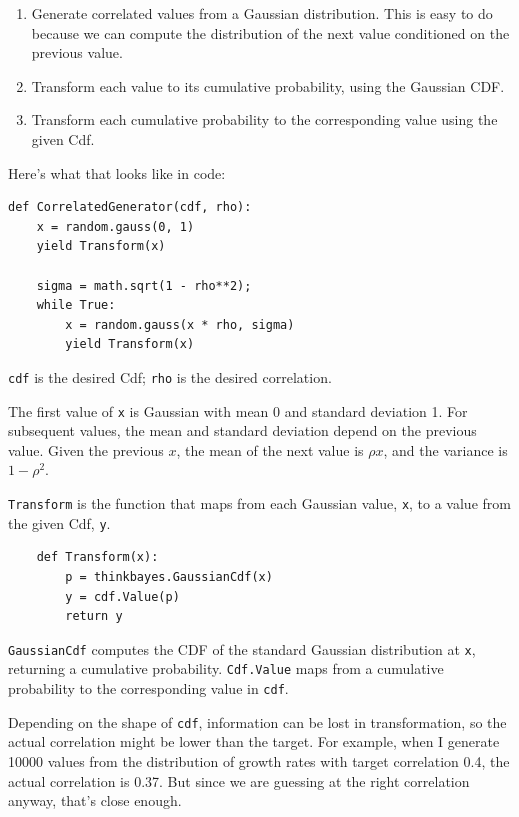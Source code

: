 \documentclass[12pt]{book}
\begin{document}
\begin{enumerate}

\item Generate correlated values from a Gaussian distribution.
  This is easy to do because we can compute the distribution
  of the next value conditioned on the previous value.

\item Transform each value to its cumulative probability, using
  the Gaussian CDF.

\item Transform each cumulative probability to the corresponding value
  using the given Cdf.

\end{enumerate}

Here's what that looks like in code:

\begin{verbatim}
def CorrelatedGenerator(cdf, rho):
    x = random.gauss(0, 1)
    yield Transform(x)

    sigma = math.sqrt(1 - rho**2);    
    while True:
        x = random.gauss(x * rho, sigma)
        yield Transform(x)
\end{verbatim}

{\tt cdf} is the desired Cdf; {\tt rho} is the desired correlation.

The first value of {\tt x} is Gaussian with mean 0 and standard
deviation 1.  For subsequent values, the mean and standard deviation
depend on the previous value.  Given the previous $x$, the mean of the
next value is $\rho x$, and the variance is $1 - \rho^2$.

{\tt Transform} is the function that maps from each
Gaussian value, {\tt x}, to a value from the given Cdf, {\tt y}.

\begin{verbatim}
    def Transform(x):
        p = thinkbayes.GaussianCdf(x)
        y = cdf.Value(p)
        return y
\end{verbatim}

{\tt GaussianCdf} computes the CDF of the standard Gaussian
distribution at {\tt x}, returning a cumulative probability.
{\tt Cdf.Value} maps from a cumulative probability to the
corresponding value in {\tt cdf}.

Depending on the shape of {\tt cdf}, information can
be lost in transformation, so the actual correlation might be
lower than the target.  For example, when I generate
10000 values from the distribution of growth rates with
target correlation 0.4, the actual correlation is 0.37.
But since we are guessing at the right correlation anyway,
that's close enough.
\end{document}
